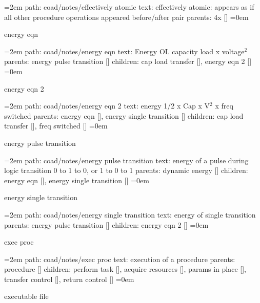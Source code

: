 \smallskip
\par\begingroup
\leftskip=2em
path: coad/notes/effectively atomic
\smallskip
text:  effectively atomic: appears as if all other procedure operations appeared before/after pair
\smallskip
parents:  4x []
\smallskip
\leftskip=0em
\par\endgroup
\bigskip
{}
energy eqn
\smallskip
\par\begingroup
\leftskip=2em
path: coad/notes/energy eqn
\smallskip
text:  Energy OL capacity load x voltage$^2$
\smallskip
parents:  energy pulse transition []
\smallskip
children: cap load transfer [], energy eqn 2 []
\smallskip
\leftskip=0em
\par\endgroup
\bigskip
{}
energy eqn 2
\smallskip
\par\begingroup
\leftskip=2em
path: coad/notes/energy eqn 2
\smallskip
text:  energy 1/2 x Cap x V$^2$ x freq switched
\smallskip
parents:  energy eqn [], energy single transition []
\smallskip
children: cap load transfer [], freq switched []
\smallskip
\leftskip=0em
\par\endgroup
\bigskip
{}
energy pulse transition
\smallskip
\par\begingroup
\leftskip=2em
path: coad/notes/energy pulse transition
\smallskip
text:  energy of a pulse during logic transition 0 to 1 to 0, or 1 to 0 to 1
\smallskip
parents:  dynamic energy []
\smallskip
children: energy eqn [], energy single transition []
\smallskip
\leftskip=0em
\par\endgroup
\bigskip
{}
energy single transition
\smallskip
\par\begingroup
\leftskip=2em
path: coad/notes/energy single transition
\smallskip
text:  energy of single transition
\smallskip
parents:  energy pulse transition []
\smallskip
children: energy eqn 2 []
\smallskip
\leftskip=0em
\par\endgroup
\bigskip
{}
exec proc
\smallskip
\par\begingroup
\leftskip=2em
path: coad/notes/exec proc
\smallskip
text:  execution of a procedure
\smallskip
parents:  procedure []
\smallskip
children: perform task [], acquire resources [], params in place [], transfer control [], return control []
\smallskip
\leftskip=0em
\par\endgroup
\bigskip
{}
executable file
\smallskip
